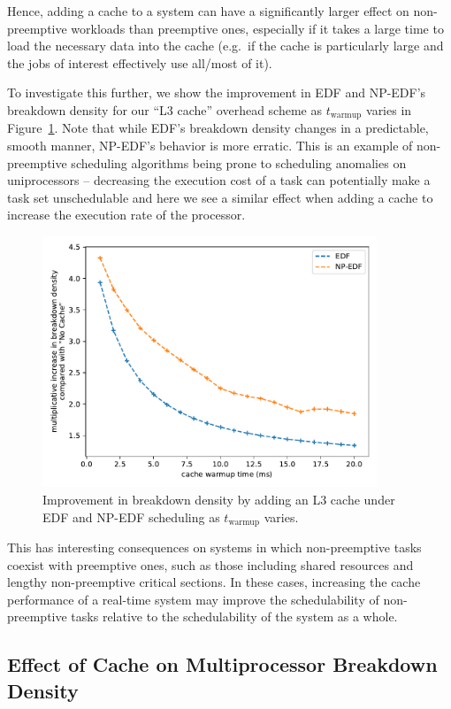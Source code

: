 \documentclass[11pt]{article}
\newcommand{\figref}[1]{Figure~\ref{#1}}
\begin{document}
Hence, adding a cache to a system can have a significantly larger effect on non-preemptive workloads than preemptive ones, especially if it takes a large time to load the necessary data into the cache (e.g.\ if the cache is particularly large and the jobs of interest effectively use all/most of it).

To investigate this further, we show the improvement in EDF and NP-EDF's breakdown density for our ``L3 cache'' overhead scheme as $t_\text{warmup}$ varies in \figref{fig:uniprocessor_cache_warmup_plots}. Note that while EDF's breakdown density changes in a predictable, smooth manner, NP-EDF's behavior is more erratic. This is an example of non-preemptive scheduling algorithms being prone to scheduling anomalies on uniprocessors -- decreasing the execution cost of a task can potentially make a task set unschedulable and here we see a similar effect when adding a cache to increase the execution rate of the processor.

\begin{figure}
	\centering
	\includegraphics[width=10cm]{uniprocessor_breakdown_density_vs_cache_warmup.pdf}
	\caption{Improvement in breakdown density by adding an L3 cache under EDF and NP-EDF scheduling as $t_\text{warmup}$ varies.}
	\label{fig:uniprocessor_cache_warmup_plots}
\end{figure}

This has interesting consequences on systems in which non-preemptive tasks coexist with preemptive ones, such as those including shared resources and lengthy non-preemptive critical sections. In these cases, increasing the cache performance of a real-time system may improve the schedulability of non-preemptive tasks relative to the schedulability of the system as a whole.

\subsection{Effect of Cache on Multiprocessor Breakdown Density}
\end{document}
